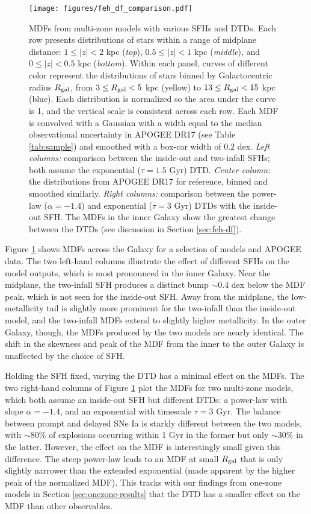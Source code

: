 \documentclass[twocolumn,twocolappendix,linenumbers]{aastex631}
\begin{document}
\begin{figure*}
    \centering
    \texttt{[image: figures/feh\_df\_comparison.pdf]}
    \caption{MDFs from multi-zone models with various SFHs and DTDs. Each row presents distributions of stars within a range of midplane distance: $1\leq|z|<2$ kpc (\textit{top}), $0.5\leq|z|<1$ kpc (\textit{middle}), and $0\leq|z|<0.5$ kpc (\textit{bottom}). Within each panel, curves of different color represent the distributions of stars binned by Galactocentric radius $R_{\rm gal}$, from $3\leq R_{\rm gal}<5$ kpc (yellow) to $13\leq R_{\rm gal}<15$ kpc (blue). Each distribution is normalized so the area under the curve is 1, and the vertical scale is consistent across each row. Each MDF is convolved with a Gaussian with a width equal to the median observational uncertainty in APOGEE DR17 (see Table \ref{tab:sample}) and smoothed with a box-car width of 0.2 dex. 
    \textit{Left columns:} comparison between the inside-out and two-infall SFHs; both assume the exponential ($\tau=1.5$ Gyr) DTD. 
    \textit{Center column:} the distributions from APOGEE DR17 for reference, binned and smoothed similarly.
    \textit{Right columns:} comparison between the power-law ($\alpha=-1.4$) and exponential ($\tau=3$ Gyr) DTDs with the inside-out SFH. The MDFs in the inner Galaxy show the greatest change between the DTDs (see discussion in Section \ref{sec:feh-df}).}
    \label{fig:feh-df-comparison}
\end{figure*}

Figure \ref{fig:feh-df-comparison} shows MDFs across the Galaxy for a selection of models and APOGEE data. The two left-hand columns illustrate the effect of different SFHs on the model outputs, which is most pronounced in the inner Galaxy. Near the midplane, the two-infall SFH produces a distinct bump $\sim0.4$ dex below the MDF peak, which is not seen for the inside-out SFH. Away from the midplane, the low-metallicity tail is slightly more prominent for the two-infall than the inside-out model, and the two-infall MDFs extend to slightly higher metallicity. In the outer Galaxy, though, the MDFs produced by the two models are nearly identical. The shift in the skewness and peak of the MDF from the inner to the outer Galaxy is unaffected by the choice of SFH.

Holding the SFH fixed, varying the DTD has a minimal effect on the MDFs. The two right-hand columns of Figure \ref{fig:feh-df-comparison} plot the MDFs for two multi-zone models, which both assume an inside-out SFH but different DTDs: a power-law with slope $\alpha=-1.4$, and an exponential with timescale $\tau=3$ Gyr. The balance between prompt and delayed SNe Ia is starkly different between the two models, with $\sim 80\%$ of explosions occurring within 1 Gyr in the former but only $\sim 30\%$ in the latter. However, the effect on the MDF is interestingly small given this difference. The steep power-law leads to an MDF at small $R_{\rm gal}$ that is only slightly narrower than the extended exponential (made apparent by the higher peak of the normalized MDF). This tracks with our findings from one-zone models in Section \ref{sec:onezone-results} that the DTD has a smaller effect on the MDF than other observables.
\end{document}
